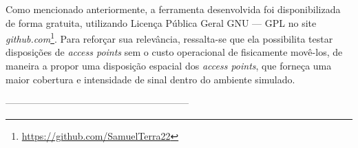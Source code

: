 \documentclass[
	12pt,				%
	twoside,			%
	a4paper,			%
	english,			%
	french,				%
	spanish,			%
	brazil				%
	]{abntex2}
\begin{document}
Como mencionado anteriormente, a ferramenta desenvolvida foi
disponibilizada de forma gratuita, utilizando Licença Pública Geral GNU
--- GPL no site \emph{github.com}\footnote{\url{https://github.com/SamuelTerra22}}.
Para reforçar sua relevância, ressalta-se que ela possibilita testar
disposições de \emph{access points} sem o custo operacional de
fisicamente movê-los, de maneira a propor uma disposição espacial dos
\emph{access points}, que forneça uma maior cobertura e intensidade de
sinal dentro do ambiente simulado.

---------------------------------------------------------

\postextual

\postextual



\end{document}
